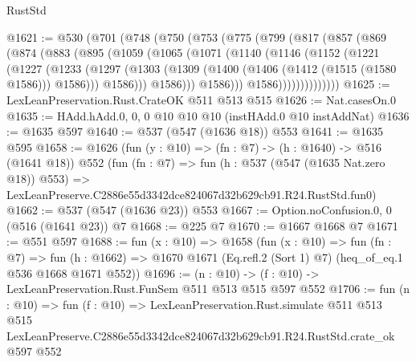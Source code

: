 \begin{lexlean}{RustStd}
\begin{coremodule}
@1621 := @530
    (@701
      (@748
        (@750
          (@753
            (@775
              (@799
                (@817
                  (@857
                    (@869
                      (@874
                        (@883
                          (@895
                            (@1059
                              (@1065
                                (@1071
                                  (@1140
                                    (@1146
                                      (@1152
                                        (@1221
                                          (@1227
                                            (@1233
                                              (@1297
                                                (@1303
                                                  (@1309
                                                    (@1400
                                                      (@1406 (@1412 (@1515 (@1580 @1586))) @1586)))
                                                  @1586)))
                                            @1586)))
                                      @1586)))
                                @1586))))))))))))))
@1625 := LexLeanPreservation.Rust.CrateOK @511 @513 @515
@1626 := Nat.casesOn.{0}
@1635 := HAdd.hAdd.{0, 0, 0} @10 @10 @10 (instHAdd.{0} @10 instAddNat)
@1636 := @1635 @597
@1640 := @537 (@547 (@1636 @18)) @553
@1641 := @1635 @595
@1658 := @1626
    (fun (y : @10) => (fn : @7) -> (h : @1640) -> @516 (@1641 @18))
    @552
    (fun (fn : @7) =>
    fun (h : @537 (@547 (@1635 Nat.zero @18)) @553) =>
    LexLeanPreserve.C2886e55d3342dce824067d32b629cb91.R24.RustStd.fun0)
@1662 := @537 (@547 (@1636 @23)) @553
@1667 := Option.noConfusion.{0, 0} (@516 (@1641 @23)) @7
@1668 := @225 @7
@1670 := @1667 @1668 @7
@1671 := @551 @597
@1688 := fun (x : @10) =>
  @1658
    (fun (x : @10) =>
    fun (fn : @7) =>
    fun (h : @1662) => @1670 @1671 (Eq.refl.{2} (Sort 1) @7) (heq_of_eq.{1} @536 @1668 @1671 @552))
@1696 := (n : @10) -> (f : @10) -> LexLeanPreservation.Rust.FunSem @511 @513 @515 @597 @552
@1706 := fun (n : @10) =>
  fun (f : @10) =>
  LexLeanPreservation.Rust.simulate
    @511
    @513
    @515
    LexLeanPreserve.C2886e55d3342dce824067d32b629cb91.R24.RustStd.crate_ok
    @597
    @552
\end{coremodule}
\end{lexlean}

